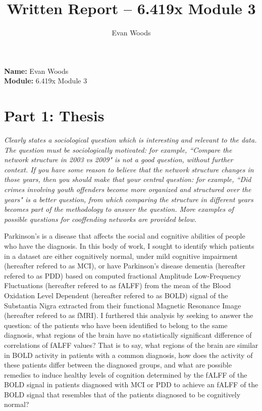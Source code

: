\documentclass[12pt]{article}
\title{Written Report – 6.419x Module 3}
\author{Evan Woods}
\date{}
\begin{document}
\maketitle

\tableofcontents
\newpage


\noindent \textbf{Name:} Evan Woods \\
\noindent \textbf{Module:} 6.419x Module 3

\section{Part 1: Thesis}

\textit{Clearly states a sociological question which is interesting and relevant to the data. The question must be sociologically motivated: for example, “Compare the network structure in 2003 vs 2009" is not a good question, without further context. If you have some reason to believe that the network structure changes in those years, then you should make that your central question: for example, “Did crimes involving youth offenders become more organized and structured over the years" is a better question, from which comparing the structure in different years becomes part of the methodology to answer the question. More examples of possible questions for cooffending networks are provided below. }

Parkinson's is a disease that affects the social and cognitive abilities of people who have the diagnosis. In this body of work, I sought to identify which patients in a dataset are either cognitively normal, under mild cognitive impairment (hereafter refered to as MCI), or have Parkinson's disease dementia (hereafter refered to as PDD) based on computed fractional Amplitude Low-Frequency Fluctuations (hereafter refered to as fALFF) from the mean of the Blood Oxidation Level Dependent (hereafter refered to as BOLD) signal of the Substantia Nigra extracted from their functional Magnetic Resonance Image (hereafter refered to as fMRI). I furthered this analysis by seeking to answer the question: of the patients who have been identified to belong to the same diagnosis, what regions of the brain have no statistically significant difference of correlations of fALFF values? That is to say, what regions of the brain are similar in BOLD activity in patients with a common diagnosis, how does the activity of these patients differ between the diagnosed groups, and what are possible remedies to induce healthy levels of cognition determined by the fALFF of the BOLD signal in patients diagnosed with MCI or PDD to achieve an fALFF of the BOLD signal that resembles that of the patients diagnosed to be cognitively normal?   
\end{document}
